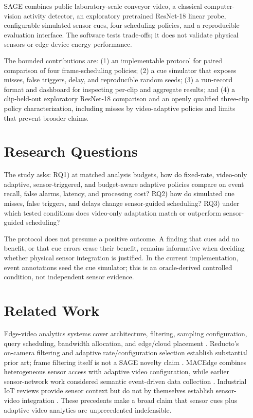 \documentclass[conference]{IEEEtran}
\begin{document}
SAGE combines public laboratory-scale conveyor video, a classical computer-vision activity detector, an exploratory pretrained ResNet-18 linear probe, configurable simulated sensor cues, four scheduling policies, and a reproducible evaluation interface. The software tests trade-offs; it does not validate physical sensors or edge-device energy performance.

The bounded contributions are: (1) an implementable protocol for paired comparison of four frame-scheduling policies; (2) a cue simulator that exposes misses, false triggers, delay, and reproducible random seeds; (3) a run-record format and dashboard for inspecting per-clip and aggregate results; and (4) a clip-held-out exploratory ResNet-18 comparison and an openly qualified three-clip policy characterization, including misses by video-adaptive policies and limits that prevent broader claims.

\section{Research Questions}
The study asks: RQ1) at matched analysis budgets, how do fixed-rate, video-only adaptive, sensor-triggered, and budget-aware adaptive policies compare on event recall, false alarms, latency, and processing cost? RQ2) how do simulated cue misses, false triggers, and delays change sensor-guided scheduling? RQ3) under which tested conditions does video-only adaptation match or outperform sensor-guided scheduling?

The protocol does not presume a positive outcome. A finding that cues add no benefit, or that cue errors erase their benefit, remains informative when deciding whether physical sensor integration is justified. In the current implementation, event annotations seed the cue simulator; this is an oracle-derived controlled condition, not independent sensor evidence.

\section{Related Work}
Edge-video analytics systems cover architecture, filtering, sampling configuration, query scheduling, bandwidth allocation, and edge/cloud placement \cite{xu2023edge,zhang2022adaptive,qian2023osmotic,lin2024learning,wang2024dependence,li2020reducto,hung2018videoedge,xiao2021performance}. Reducto's on-camera filtering and adaptive rate/configuration selection establish substantial prior art; frame filtering itself is not a SAGE novelty claim \cite{li2020reducto,zhang2022adaptive}. MACEdge combines heterogeneous sensor access with adaptive video configuration, while earlier sensor-network work considered semantic event-driven data collection \cite{zhong2023macedge,vaisenberg2009exploiting}. Industrial IoT reviews provide sensor context but do not by themselves establish sensor-video integration \cite{industrialmachinery2023mapping}. These precedents make a broad claim that sensor cues plus adaptive video analytics are unprecedented indefensible.
\end{document}
